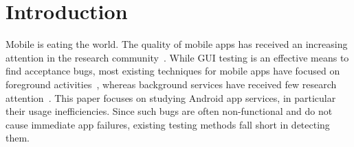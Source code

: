 \documentclass[sigconf,review, anonymous]{acmart}
\begin{document}
%
%
%
%


\maketitle

\section{Introduction}
Mobile is eating the world.
The quality of mobile apps has received an increasing
attention in the research
community~\cite{ReavesBGABCDHKS16,AnandNHY12,MachiryTN13,ChoiNS13,LiuXC14,BanerjeeC0R14,LiuXCL14,HechtBRMD15,BehrouzSBM16,MirzaeiGBSM16,SuMCWYYPLS17,FanSCMLXPS18}.
While GUI testing is an effective means to find acceptance bugs, most existing
techniques for mobile apps have focused on foreground
activities~\cite{monkey,AnandNHY12,MachiryTN13,ChoiNS13,MirzaeiGBSM16,BaekB16,SuMCWYYPLS17,SongQH17},
whereas background services have received few research
attention~\cite{ZhangLLC17,ma2018}.
This paper focuses on studying Android app services, in particular
their usage inefficiencies. Since such bugs are often non-functional and do not
cause immediate app failures, existing testing methods fall short in
detecting them.
\end{document}
